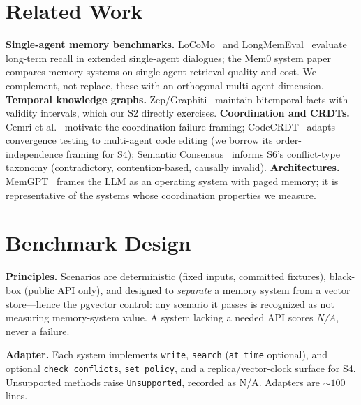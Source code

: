 \documentclass[11pt]{article}
\begin{document}
\section{Related Work}
\textbf{Single-agent memory benchmarks.} LoCoMo~\cite{maharana2024locomo} and
LongMemEval~\cite{wu2025longmemeval} evaluate long-term recall in extended
single-agent dialogues; the Mem0 system paper~\cite{chhikara2025mem0} compares memory
systems on single-agent retrieval quality and cost. We complement, not replace, these
with an orthogonal multi-agent dimension. \textbf{Temporal knowledge graphs.}
Zep/Graphiti~\cite{rasmussen2025zep} maintain bitemporal facts with validity
intervals, which our S2 directly exercises. \textbf{Coordination and CRDTs.}
Cemri et al.~\cite{cemri2025mast} motivate the coordination-failure framing;
CodeCRDT~\cite{codecrdt2025} adapts convergence testing to multi-agent code editing
(we borrow its order-independence framing for S4); Semantic
Consensus~\cite{acharya2026semconsensus} informs S6's conflict-type taxonomy
(contradictory, contention-based, causally invalid). \textbf{Architectures.}
MemGPT~\cite{packer2023memgpt} frames the LLM as an operating system with paged
memory; it is representative of the systems whose coordination properties we measure.

\section{Benchmark Design}\label{sec:design}
\textbf{Principles.} Scenarios are deterministic (fixed inputs, committed fixtures),
black-box (public API only), and designed to \emph{separate} a memory system from a
vector store---hence the pgvector control: any scenario it passes is recognized as
not measuring memory-system value. A system lacking a needed API scores \emph{N/A},
never a failure.

\textbf{Adapter.} Each system implements \texttt{write}, \texttt{search}
(\texttt{at\_time} optional), and optional \texttt{check\_conflicts},
\texttt{set\_policy}, and a replica/vector-clock surface for S4. Unsupported methods
raise \texttt{Unsupported}, recorded as N/A. Adapters are ${\sim}100$ lines.
\end{document}
